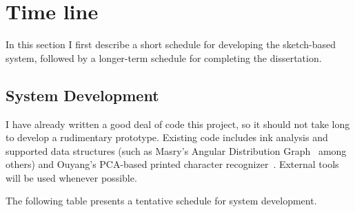 \documentclass[12pt]{article}
\begin{document}
\section{Time line}

In this section I first describe a short schedule for developing the
sketch-based system, followed by a longer-term schedule for completing
the dissertation. 

\subsection{System Development}
\label{sec:system-development-schedule}

I have already written a good deal of code this project, so it should
not take long to develop a rudimentary prototype. Existing code
includes ink analysis and supported data structures (such as Masry's
Angular Distribution Graph~\cite{masry-3d-sketch} among others) and
Ouyang's PCA-based printed character
recognizer~\cite{ouyang-visual-recog}. External tools will be used
whenever possible.

The following table presents a tentative schedule for system development.
\end{document}
